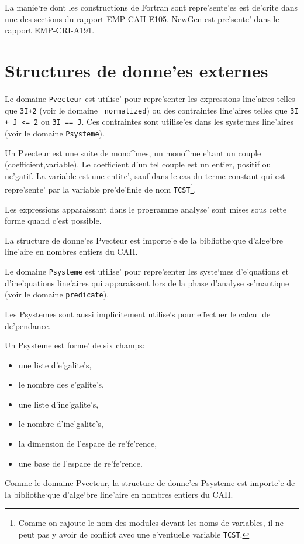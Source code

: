 La manie`re dont les constructions de Fortran sont repre'sente'es est
de'crite dans une des sections du rapport EMP-CAII-E105. NewGen est
pre'sente' dans le rapport EMP-CRI-A191.

\section{Structures de donne'es externes}
\label{external}

{ Le domaine {\tt Pvecteur} est utilise' pour repre'senter les
expressions line'aires telles que {\tt 3I+2} (voir le domaine {\tt
normalized}) ou des contraintes line'aires telles que {\tt 3I + J <= 2}
ou {\tt 3I == J}. Ces contraintes sont utilise'es dans les syste`mes
line'aires (voir le domaine {\tt Psysteme}).

Un Pvecteur est une suite de mono^mes, un mono^me e'tant un couple
(coefficient,variable).  Le coefficient d'un tel couple est un entier,
positif ou ne'gatif. La variable est une entite', sauf dans le cas du
terme constant qui est repre'sente' par la variable pre'de'finie de nom
{\tt TCST}\footnote{Comme on rajoute le nom des modules devant les
noms de variables, il ne peut pas y avoir de conflict avec une
e'ventuelle variable {\tt TCST}.}.

Les expressions apparaissant dans le programme analyse' sont mises
sous cette forme quand c'est possible.

La structure de donne'es Pvecteur est importe'e de la bibliothe`que d'alge`bre
line'aire en nombres entiers du CAII.
}
{
Le domaine {\tt Psysteme} est utilise' pour repre'senter les syste`mes
d'e'quations et d'ine'quations line'aires qui apparaissent lors
de la phase d'analyse se'mantique (voir le domaine {\tt predicate}).

Les Psystemes sont aussi implicitement utilise's pour effectuer le
calcul de de'pendance.

Un Psysteme est forme' de six champs:
\begin{itemize}
  \item une liste d'e'galite's,
  \item le nombre des e'galite's,
  \item une liste d'ine'galite's,
  \item le nombre d'ine'galite's,
  \item la dimension de l'espace de re'fe'rence,
  \item une base de l'espace de re'fe'rence.
\end{itemize}

Comme le domaine Pvecteur, la structure de donne'es Psysteme est
importe'e de la bibliothe`que d'alge`bre line'aire en nombres entiers du
CAII.  }

